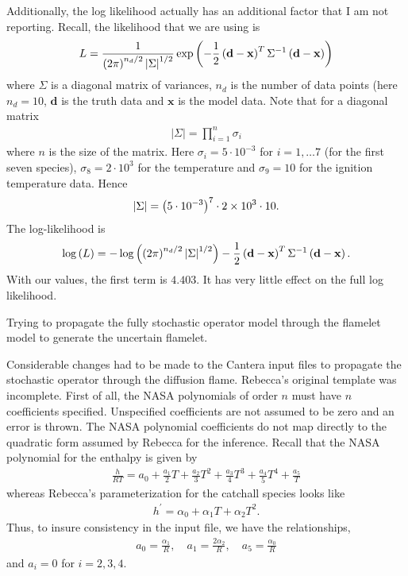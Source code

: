 Additionally, the log likelihood actually has an additional factor that 
I am not reporting.  Recall, the likelihood that we are using is 
\begin{align}
  L = \frac{1}{\left(2\pi\right)^{n_{d}/2}\left|\Sigma\right|^{1/2}}
     \exp\left(-\frac{1}{2}\left(\mathbf{d} - \mathbf{x}\right)^{T}\Sigma^{-1}\left(\mathbf{d} - \mathbf{x}\right)\right)
\end{align}
where $\Sigma$ is a diagonal matrix of variances, $n_{d}$ is the number of data points (here
$n_{d} = 10$, $\mathbf{d}$ is the truth data and $\mathbf{x}$ is the model data.  Note that for a 
diagonal matrix 
\begin{align}
  \left|\Sigma\right| = \prod_{i=1}^{n}\sigma_{i}
\end{align}
where $n$ is the size of the matrix.  Here $\sigma_{i} = 5\cdot 10^{-3}$ for $i=1,\ldots 7$
(for the first seven species), $\sigma_{8} = 2\cdot 10^{3}$ for the temperature 
and $\sigma_{9} = 10$ for the ignition temperature data.  Hence
\begin{align}
  \left|\Sigma\right| = \left(5\cdot 10^{-3}\right)^{7} \cdot 2\times 10^{3} \cdot 10.
\end{align}
The log-likelihood is 
\begin{align}
  \log\left(L\right) = -\log\left(\left(2\pi\right)^{n_{d}/2}\left|\Sigma\right|^{1/2}\right) - 
      \frac{1}{2}\left(\mathbf{d} - \mathbf{x}\right)^{T}\Sigma^{-1}\left(\mathbf{d} - \mathbf{x}\right).
\end{align}
With our values, the first term is $4.403$.  It has very little effect on the full
log likelihood.

Trying to propagate the fully stochastic operator model through the flamelet model to generate 
the uncertain flamelet.

Considerable changes had to be made to the Cantera input files to propagate the stochastic 
operator through the diffusion flame.  Rebecca's original template was incomplete.  First of 
all, the NASA polynomials of order $n$ must have $n$ coefficients specified.  Unspecified 
coefficients are not assumed to be zero and an error is thrown.  The NASA polynomial 
coefficients do not map directly to the quadratic form assumed by Rebecca for the inference. 
Recall that the NASA polynomial for the enthalpy is given by 
\begin{align}
  \frac{h}{RT} = a_{0} + \frac{a_{1}}{2}T + \frac{a_{2}}{3}T^{2} + \frac{a_{3}}{4}T^{3} + 
       \frac{a_{4}}{5}T^{4} + \frac{a_{5}}{T}
\end{align}
whereas Rebecca's parameterization for the catchall species looks like 
\begin{align}
  h^{\prime} = \alpha_{0} + \alpha_{1}T + \alpha_{2}T^{2}.
\end{align}
Thus, to insure consistency in the input file, we have the relationships,
\begin{align}
  a_{0} = \frac{\alpha_{1}}{R}, \quad a_{1} = \frac{2\alpha_{2}}{R}, \quad a_{5} = \frac{\alpha_{0}}{R}
\end{align}
and $a_{i} = 0$ for $i=2, 3, 4$.

